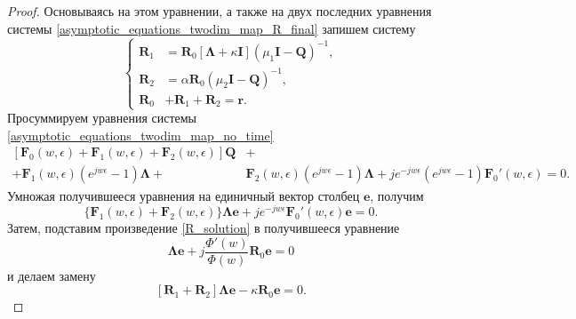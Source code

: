 \begin{proof}
Основываясь на этом уравнении, а также на двух последних уравнения системы \eqref{asymptotic_equations_twodim_map_R_final} запишем систему
\begin{equation} \label{R_system}
	\left\{
	\begin{aligned}
		\boldsymbol{R}_{1}& = \boldsymbol{R}_{0}[\boldsymbol{\Lambda} + \kappa\boldsymbol{I}](\mu_{1}\boldsymbol{I} - \boldsymbol{Q})^{-1},\\
		\boldsymbol{R}_{2}& = \alpha\boldsymbol{R}_{0}(\mu_2\boldsymbol{I} - \boldsymbol{Q})^{-1},\\
		\boldsymbol{R}_{0}& + \boldsymbol{R}_{1} + \boldsymbol{R}_{2} = \boldsymbol{r}.
	\end{aligned}
	\right.
\end{equation}
Просуммируем уравнения системы \eqref{asymptotic_equations_twodim_map_no_time}
\begin{equation*}
	\begin{split}
		[\boldsymbol{F}_{0}(w,\epsilon) + \boldsymbol{F}_{1}(w,\epsilon) +  \boldsymbol{F}_{2}(w,\epsilon)]\boldsymbol{Q} &+\\  + 
		\boldsymbol{F}_{1}(w,\epsilon)(e^{jw\epsilon} - 1)\boldsymbol{\Lambda} + & \boldsymbol{F}_{2}(w,\epsilon)(e^{jw\epsilon} - 1)\boldsymbol{\Lambda} + je^{-jw\epsilon}(e^{jw\epsilon} - 1)\boldsymbol{F}_{0}'(w,\epsilon) = 0.
	\end{split}
\end{equation*}
Умножая получившееся уравнения на единичный вектор столбец $\boldsymbol{e}$, получим
\begin{equation*}
	\{\boldsymbol{F}_{1}(w,\epsilon) + \boldsymbol{F}_{2}(w,\epsilon)\}\boldsymbol{\Lambda}\boldsymbol{e} + je^{-jw\epsilon}\boldsymbol{F}_{0}'(w,\epsilon)\boldsymbol{e} = 0.
\end{equation*}
Затем, подставим произведение \eqref{R_solution} в получившееся уравнение
\begin{equation*}
	[\boldsymbol{R}_{1} + \boldsymbol{R}_{2}]\boldsymbol{\Lambda}\boldsymbol{e} + j\frac{\Phi'(w)}{\Phi(w)}\boldsymbol{R}_{0}\boldsymbol{e} = 0
\end{equation*}
 и делаем замену
 \begin{equation} \label{R_kappa_exression}
 	[\boldsymbol{R}_{1} + \boldsymbol{R}_{2}]\boldsymbol{\Lambda}\boldsymbol{e} -\kappa\boldsymbol{R}_{0}\boldsymbol{e} = 0.
\end{equation}


\end{proof}
